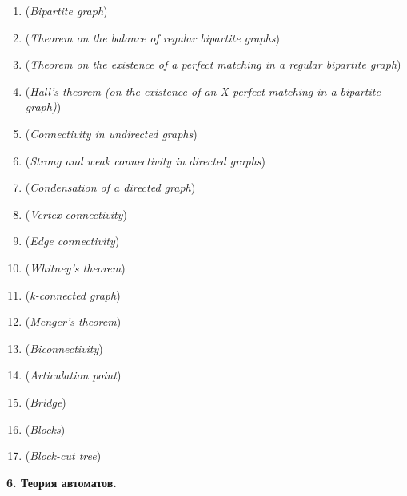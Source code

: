 \documentclass[12pt]{article}
\begin{document}
\begin{enumerate}
        \item \textbf{} (\textit{Bipartite graph})

        \item \textbf{} (\textit{Theorem on the balance of regular bipartite graphs})

        \item \textbf{} (\textit{Theorem on the existence of a perfect matching in a regular bipartite graph})

        \item \textbf{} (\textit{Hall's theorem (on the existence of an X-perfect matching in a bipartite graph)})

        \item \textbf{} (\textit{Connectivity in undirected graphs})

        \item \textbf{} (\textit{Strong and weak connectivity in directed graphs})

        \item \textbf{} (\textit{Condensation of a directed graph})

        \item \textbf{} (\textit{Vertex connectivity})

        \item \textbf{} (\textit{Edge connectivity})

        \item \textbf{} (\textit{Whitney's theorem})

        \item \textbf{} (\textit{k-connected graph})

        \item \textbf{} (\textit{Menger's theorem})

        \item \textbf{} (\textit{Biconnectivity})

        \item \textbf{} (\textit{Articulation point})

        \item \textbf{} (\textit{Bridge})

        \item \textbf{} (\textit{Blocks})

        \item \textbf{} (\textit{Block-cut tree})

    \end{enumerate}

    \begin{center}
        \textbf{6. Теория автоматов.}
    \end{center}
\end{document}
